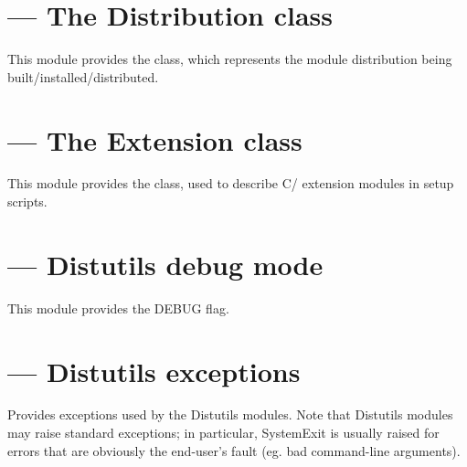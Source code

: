\documentclass{manual}
\begin{document}

\section{ --- The Distribution class}

This module provides the  class, which represents
the module distribution being built/installed/distributed.


\section{ --- The Extension class}

This module provides the  class, used to describe
C/\Cpp{} extension modules in setup scripts.


\section{ --- Distutils debug mode}

This module provides the DEBUG flag.

\section{ --- Distutils exceptions}

Provides exceptions used by the Distutils modules.  Note that Distutils
modules may raise standard exceptions; in particular, SystemExit is
usually raised for errors that are obviously the end-user's fault
(eg. bad command-line arguments).
\end{document}
